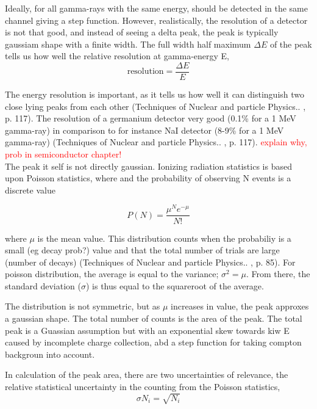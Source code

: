 \documentclass[a4paper,11pt,twoside]{book}
\begin{document}
Ideally, for all gamma-rays with the same energy, should be detected in the same channel giving a step function. However, realistically, the resolution of a detector is not that good, and instead of seeing a delta peak, the peak is typically gaussiam shape with a finite width. The full width half maximum $\Delta E$ of the peak tells us how well the relative resolution at gamma-energy E,
\begin{equation}
    \text{resolution} = \frac{\Delta E}{E}
\end{equation}

The energy resolution is important, as it tells us how well it can distinguish two close lying peaks from each other (Techniques of Nuclear and particle Physics.. , p. 117).  The resolution of a germanium detector very good (0.1\% for a 1 MeV gamma-ray) in comparison to for instance NaI detector (8-9\% for a 1 MeV gamma-ray) (Techniques of Nuclear and particle Physics.. , p. 117). \textcolor{red}{explain why, prob in semiconductor chapter!} \\


The peak it self is not directly gaussian. Ionizing radiation statistics is based upon Poisson statistics, where  and the probability of observing N events is a discrete value

\begin{equation}
    P(N) = \frac{\mu^N e^{-\mu}}{N!}
\end{equation}

where $\mu$ is the mean value. This distribution counts when the probabiliy is a small (eg decay prob?) value and that the total number of trials are large (number of decays) (Techniques of Nuclear and particle Physics.. , p. 85).  For poisson distribution, the average is equal to the variance; $\sigma^2=\mu$. From there, the standard deviation ($\sigma$) is thus equal to the squareroot of the average. 

The distribution is not symmetric, but as $\mu$ increases in value, the peak approxes a gaussian shape. The total number of counts is the area of the peak. The total peak is a Guassian assumption but with an exponential skew towards kiw E caused by incomplete charge collection, abd a step function for taking compton backgroun into account. 

In calculation of the peak area, there are two uncertainties of relevance, the relative statistical uncertainty in the counting from the Poisson statistics, 
\begin{equation}
\sigma N_i = \sqrt{N_i}
\end{equation}
\end{document}
